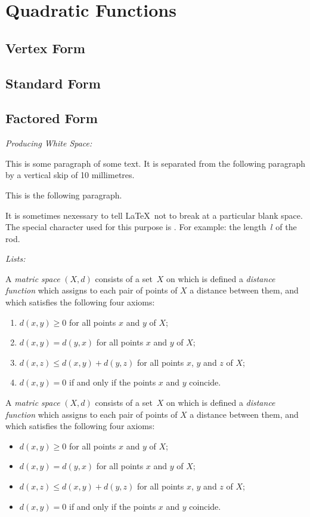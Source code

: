 \documentclass[12pt]{article}
\begin{document}
\section{Quadratic Functions}
\subsection{Vertex Form}
\subsection{Standard Form}
\subsection{Factored Form}
\pagebreak

\noindent
\begin{large}\textit{Producing White Space:}\end{large}

This is some paragraph of some text. It is separated from the following paragraph by a vertical skip of 10 millimetres.

\vspace{10 mm}
This is the following paragraph.

It is sometimes nexessary to tell \LaTeX\ not to break at a particular blank space. The special character used for this purpose is . For example: the length~$l$ of the rod. \\

\noindent
\begin{large}\textit{Lists:}\end{large}

A \emph{matric space} $(X,d)$ consists of a set~$X$ on which is defined a \emph{distance function} which assigns to each pair of points of $X$ a distance between them, and which satisfies the following four axioms:
\begin{enumerate}
\item
$d(x,y) \geq 0$ for all points $x$ and $y$ of $X$;
\item
$d(x,y) = d(y,x)$ for all points $x$ and $y$ of $X$;
\item
$d(x,z) \leq d(x,y) + d(y,z)$ for all points $x$, $y$ and $z$ of $X$;
\item
$d(x,y) = 0$ if and only if the points $x$ and $y$ coincide.
\end{enumerate}

A \emph{matric space} $(X,d)$ consists of a set~$X$ on which is defined a \emph{distance function} which assigns to each pair of points of $X$ a distance between them, and which satisfies the following four axioms:
\begin{itemize}
\item
$d(x,y) \geq 0$ for all points $x$ and $y$ of $X$;
\item
$d(x,y) = d(y,x)$ for all points $x$ and $y$ of $X$;
\item
$d(x,z) \leq d(x,y) + d(y,z)$ for all points $x$, $y$ and $z$ of $X$;
\item
$d(x,y) = 0$ if and only if the points $x$ and $y$ coincide.
\end{itemize}
\end{document}
